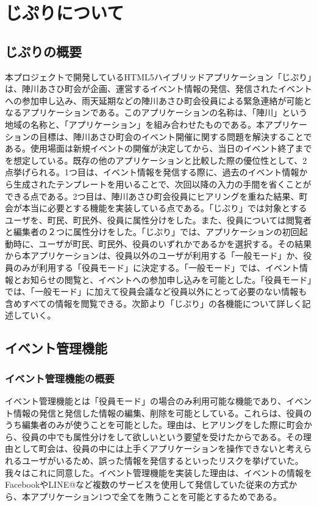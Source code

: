 \chapter{じぷりについて}

\section{じぷりの概要}%
本プロジェクトで開発しているHTML5ハイブリッドアプリケーション「じぷり」は、陣川あさひ町会が企画、運営するイベント情報の発信、発信されたイベントへの参加申し込み、雨天延期などの陣川あさひ町会役員による緊急連絡が可能となるアプリケーションである。このアプリケーションの名称は、「陣川」という地域の名称と、「アプリケーション」を組み合わせたものである。本アプリケーションの目標は、陣川あさひ町会のイベント開催に関する問題を解決することである。使用場面は新規イベントの開催が決定してから、当日のイベント終了までを想定している。既存の他のアプリケーションと比較した際の優位性として、2点挙げられる。1つ目は、イベント情報を発信する際に、過去のイベント情報から生成されたテンプレートを用いることで、次回以降の入力の手間を省くことができる点である。2つ目は、陣川あさひ町会役員にヒアリングを重ねた結果、町会が本当に必要とする機能を実装している点である。「じぷり」では対象とするユーザを、町民、町民外、役員に属性分けをした。また、役員については閲覧者と編集者の２つに属性分けをした。「じぷり」では、アプリケーションの初回起動時に、ユーザが町民、町民外、役員のいずれかであるかを選択する。その結果から本アプリケーションは、役員以外のユーザが利用する「一般モード」か、役員のみが利用する「役員モード」に決定する。「一般モード」では、イベント情報とお知らせの閲覧と、イベントへの参加申し込みを可能とした。「役員モード」では、「一般モード」に加えて役員会議など役員以外にとって必要のない情報も含めすべての情報を閲覧できる。次節より「じぷり」の各機能について詳しく記述していく。

\section{イベント管理機能}%
\subsection{イベント管理機能の概要}%
イベント管理機能とは「役員モード」の場合のみ利用可能な機能であり、イベント情報の発信と発信した情報の編集、削除を可能としている。これらは、役員のうち編集者のみが使うことを可能とした。理由は、ヒアリングをした際に町会から、役員の中でも属性分けをして欲しいという要望を受けたからである。その理由として町会は、役員の中には上手くアプリケーションを操作できないと考えられるユーザがいるため、誤った情報を発信するといったリスクを挙げていた。我々はこれに同意した。イベント管理機能を実装した理由は、イベントの情報をFacebookやLINE@など複数のサービスを使用して発信していた従来の方式から、本アプリケーション1つで全てを賄うことを可能とするためである。

